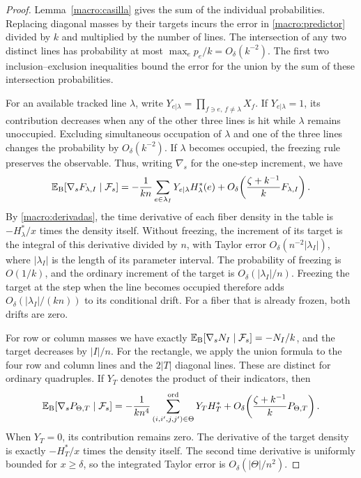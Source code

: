 \begin{proof}
Lemma~\ref{macro:casilla} gives the sum of the individual probabilities. Replacing diagonal masses by
their targets incurs the error in \eqref{macro:predictor} divided by $k$ and multiplied by the number
of lines. The intersection of any two distinct lines has probability at most
$\max_e p_e/k=O_\delta(k^{-2})$. The first two inclusion--exclusion inequalities bound the error for
the union by the sum of these intersection probabilities.

For an available tracked line $\lambda$, write $Y_{e|\lambda}=\prod_{f\ni e,\,f\ne\lambda}X_f$.
If $Y_{e|\lambda}=1$, its contribution decreases when any of the other three lines is hit while
$\lambda$ remains unoccupied. Excluding simultaneous occupation of $\lambda$ and one of the three
lines changes the probability by $O_\delta(k^{-2})$. If $\lambda$ becomes occupied, the freezing
rule preserves the observable. Thus, writing $\nabla_s$ for the one-step increment, we have
\[
 \mathbb{E}_{\rm B}[\nabla_s F_{\lambda,I}\mid\mathcal F_s]
 =-\frac1{kn}\sum_{e\in\lambda_I}Y_{e|\lambda}H_\lambda^*(e)
   +O_\delta\!\left(\frac{\zeta+k^{-1}}{k}F_{\lambda,I}\right).
\]
By \eqref{macro:derivadas}, the time derivative of each fiber density in the table is $-H^*_\lambda/x$
times the density itself. Without freezing, the increment of its target is the integral of this
derivative divided by $n$, with Taylor error $O_\delta(n^{-2}|\lambda_I|)$, where $|\lambda_I|$ is
the length of its parameter interval. The probability of freezing is $O(1/k)$, and the ordinary
increment of the target is $O_\delta(|\lambda_I|/n)$. Freezing the target at the step when the line
becomes occupied therefore adds $O_\delta(|\lambda_I|/(kn))$ to its conditional drift. For a fiber
that is already frozen, both drifts are zero.

For row or column masses we have exactly $\mathbb{E}_{\rm B}[\nabla_s N_I\mid\mathcal F_s]=-N_I/k$, and the
target decreases by $|I|/n$. For the rectangle, we apply the union formula to the four row and column
lines and the $2|T|$ diagonal lines. These are distinct for ordinary quadruples. If $Y_{T}$ denotes
the product of their indicators, then
\[
 \mathbb{E}_{\rm B}[\nabla_s P_{\Theta,T}\mid\mathcal F_s]
 =-\frac1{kn^4}\sum_{(i,i',j,j')\in\Theta}^{\rm ord}Y_T H_T^*
   +O_\delta\!\left(\frac{\zeta+k^{-1}}{k}P_{\Theta,T}\right).
\]
When $Y_T=0$, its contribution remains zero. The derivative of the target density is exactly
$-H_T^*/x$ times the density itself. The second time derivative is uniformly bounded for $x\ge\delta$,
so the integrated Taylor error is $O_\delta(|\Theta|/n^2)$.
\end{proof}

